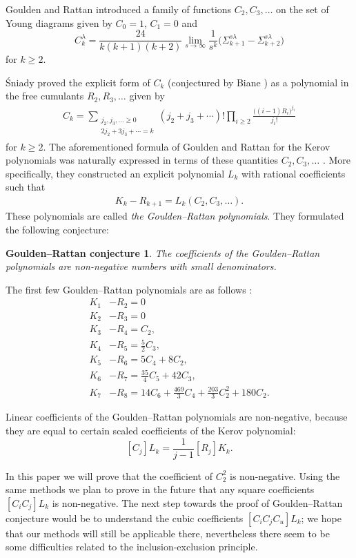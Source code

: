 \documentclass[submission]{FPSAC2021}
\newtheorem*{conjecture}{Goulden--Rattan conjecture}
\begin{document}
Goulden and Rattan \cite{GR05} introduced 
a family of functions $C_2,C_3,\dots$ on 
the set of Young diagrams given by
$C_0=1$, $C_1=0$ and
$$C_k^{\lambda}=\frac{24}{k(k+1)(k+2)}\lim_{s\to\infty}\frac{1}{s^k}\big(\Sigma_{k+1}^{s\lambda}-\Sigma_{k+2}^{s\lambda}\big)$$
for $k\geq2$.

Śniady \cite{Sni06} proved the explicit form of $C_k$
(conjectured by Biane \cite{Bia03}) as a polynomial in the 
free cumulants $R_2, R_3, \ldots$ given by
\begin{align}
\label{cformula}
C_k=\sum_{\substack{j_2,j_3,\ldots \geq 0 \\ 2j_2+3j_3+\cdots=k}}
(j_2+j_3+\cdots)!\prod_{i\geq 2} \frac{\big( (i-1)R_i\big)^{j_i}}{j_i!}
\end{align}
for $k\geq 2$.
The aforementioned formula of Goulden and Rattan for 
the Kerov polynomials was naturally expressed in 
terms of these quantities $C_2,C_3,\dots$ \cite{GR05}. 
More specifically, they constructed an explicit 
polynomial $L_k$ with rational coefficients such that 
\begin{align}
\label{grpol}
K_k-R_{k+1}=L_k(C_2, C_3, \ldots).
\end{align}
These polynomials are called 
\emph{the Goulden--Rattan polynomials}. 
They formulated the following conjecture:
\begin{conjecture}
\label{hipotezaGR}
The coefficients of the Goulden--Rattan polynomials 
are non-negative numbers with small denominators. 
\end{conjecture}
The first few Goulden--Rattan polynomials are 
as follows \cite{GR05}:
\begin{align*}
K_1&-R_2=0\\
K_2&-R_3=0\\
K_3&-R_4=C_2,\\
K_4&-R_5=\frac{5}{2}C_3,\\
K_5&-R_6=5C_4+8C_2,\\
K_6&-R_7=\frac{35}{4}C_5+42C_3,\\
K_7&-R_8=14C_6+\frac{469}{3}C_4+\frac{203}{3}C_2^2+180C_2.
\end{align*}

Linear coefficients of the Goulden--Rattan polynomials 
are non-negative, because they are equal to certain 
scaled coefficients of the Kerov polynomial:
\[ [ C_j ] L_k=\frac{1}{j-1} [ R_j ] K_k. \]

In this paper we will prove that the coefficient 
of $C_2^2$ is non-negative. Using the same methods 
we plan to prove in the future that 
any square coefficients $[ C_i C_j ] L_k$ is 
non-negative. The next step towards the proof of 
Goulden--Rattan conjecture would be to understand 
the cubic coefficients $ [ C_i C_j C_u ] L_k$; we 
hope that our methods will still be applicable there,
nevertheless there seem to be some difficulties 
related to the inclusion-exclusion principle.
\end{document}
